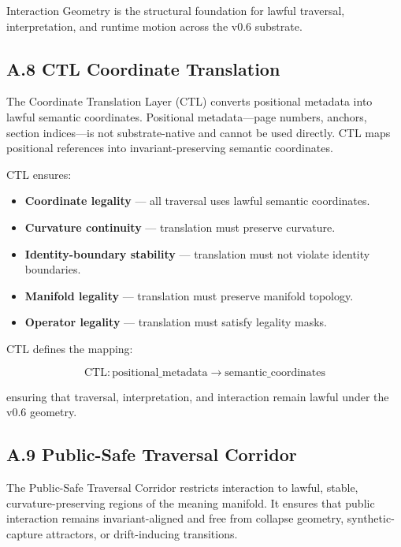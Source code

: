 \medskip

\noindent Interaction Geometry is the structural foundation for lawful traversal,
interpretation, and runtime motion across the v0.6 substrate.

\subsection*{A.8 CTL Coordinate Translation}

\noindent The Coordinate Translation Layer (CTL) converts positional metadata
into lawful semantic coordinates. Positional metadata—page numbers, anchors,
section indices—is not substrate-native and cannot be used directly. CTL maps
positional references into invariant-preserving semantic coordinates.

\medskip

\noindent CTL ensures:

\begin{itemize}
    \item \textbf{Coordinate legality} — all traversal uses lawful semantic
    coordinates.
    \item \textbf{Curvature continuity} — translation must preserve curvature.
    \item \textbf{Identity-boundary stability} — translation must not violate
    identity boundaries.
    \item \textbf{Manifold legality} — translation must preserve manifold
    topology.
    \item \textbf{Operator legality} — translation must satisfy legality masks.
\end{itemize}

\medskip

\noindent CTL defines the mapping:



\[
\mathrm{CTL} : \text{positional\_metadata} \rightarrow
\text{semantic\_coordinates}
\]



\noindent ensuring that traversal, interpretation, and interaction remain lawful
under the v0.6 geometry.

\subsection*{A.9 Public-Safe Traversal Corridor}

\noindent The Public-Safe Traversal Corridor restricts interaction to lawful,
stable, curvature-preserving regions of the meaning manifold. It ensures that
public interaction remains invariant-aligned and free from collapse geometry,
synthetic-capture attractors, or drift-inducing transitions.

